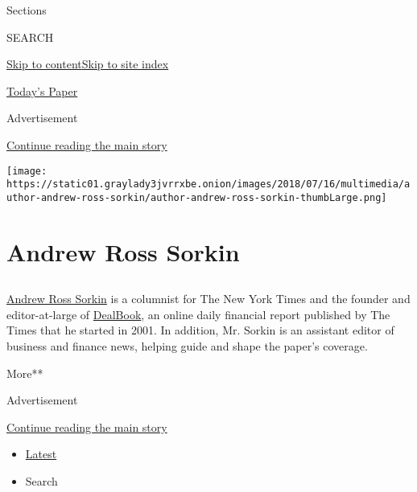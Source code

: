 Sections

SEARCH

\protect\hyperlink{site-content}{Skip to
content}\protect\hyperlink{site-index}{Skip to site index}

\href{https://myaccount.nytimes3xbfgragh.onion/auth/login?response_type=cookie\&client_id=vi}{}

\href{https://www.nytimes3xbfgragh.onion/section/todayspaper}{Today's
Paper}

Advertisement

\protect\hyperlink{after-top}{Continue reading the main story}

\texttt{[image: https://static01.graylady3jvrrxbe.onion/images/2018/07/16/multimedia/author-andrew-ross-sorkin/author-andrew-ross-sorkin-thumbLarge.png]}

\hypertarget{andrew-ross-sorkin}{%
\section{Andrew Ross Sorkin}\label{andrew-ross-sorkin}}

\subsection{}

\href{http://www.andrewrosssorkin.com}{Andrew Ross Sorkin} is a
columnist for The New York Times and the founder and editor-at-large of
\href{http://dealbook.nytimes3xbfgragh.onion}{DealBook}, an online daily
financial report published by The Times that he started in 2001. In
addition, Mr. Sorkin is an assistant editor of business and finance
news, helping guide and shape the paper's coverage.

More**

Advertisement

\protect\hyperlink{after-mid1}{Continue reading the main story}

\begin{itemize}
\tightlist
\item
  \protect\hyperlink{stream-panel}{Latest}
\item
  Search
\end{itemize}

